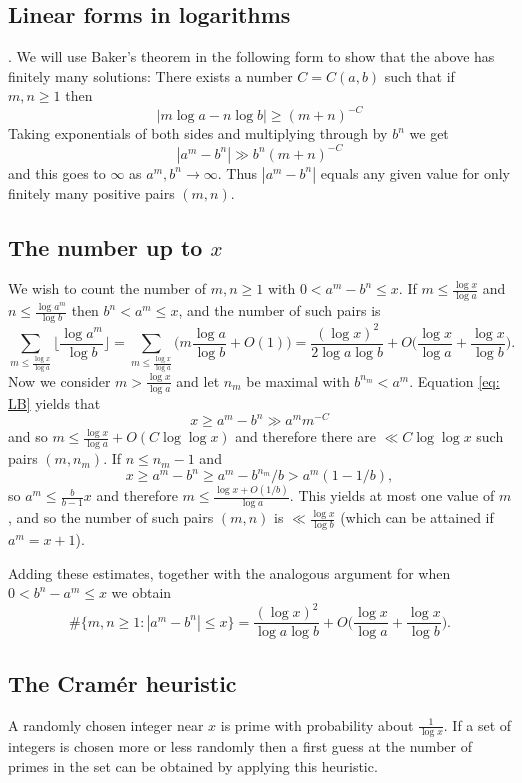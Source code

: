 \documentclass[12pt, a4paper,  reqno, english]{amsart}%
\numberwithin{equation}{section}
\theoremstyle{definition}
\renewcommand{\leq}{\leqslant}
\renewcommand{\geq}{\geqslant}
\begin{document}
\subsection{Linear forms in logarithms}
.  We will use Baker's theorem \cite{Bak} in the following form to show that the above has finitely many solutions: There exists a number $C=C(a,b)$ such that if $m,n\geq 1$ then
\[
|m\log a-n\log b|\geq (m+n)^{-C}
 \]
 Taking exponentials of both sides and multiplying through by $b^n$ we get
 \begin{equation} \label{eq: LB}
    |a^m-b^n| \gg b^n(m+n)^{-C}
 \end{equation}
 and this goes to $\infty$ as $a^m,b^n\to \infty$. 
 Thus  $|a^m - b^n |$ equals any given value for only finitely many positive pairs $(m,n)$.
 

\subsection{The number up to $x$}
We wish to count the number of $m,n\geq 1$ with $0<a^m-b^n\leq x$. 
If $m\leq \frac{\log x}{\log a}$  and $n\leq \frac{\log a^m}{\log b}$ then $b^n<a^m\leq x$, and the number of such pairs is
\[
\sum_{m\leq \frac{\log x}{\log a}} \bigg\lfloor \frac{\log a^m}{\log b} \bigg\rfloor = 
\sum_{m\leq \frac{\log x}{\log a}} \bigg( m \frac{\log a}{\log b}+O(1) \bigg) = \frac{(\log x)^2}{2\log a \log b} +O\bigg( \frac{\log x}{\log a}+\frac{\log x}{\log b} \bigg) .
\]
Now we consider $m> \frac{\log x}{\log a}$ and let $n_m$ be maximal with $b^{n_m}<a^m$.
  Equation \eqref{eq: LB} yields that 
  \[  x\geq a^m-b^n \gg a^mm^{-C} \]
  and so $m\leq \frac{\log x}{\log a}+O( C \log\log x)$ and therefore there are $\ll C \log\log x$ such pairs   
  $(m,n_m)$. If $n\leq n_m-1$ and 
\[
x\geq a^m-b^n\geq a^m-b^{n_m}/b>a^m(1-1/b),
\]
so $a^m\leq \frac b{b-1} x$ and therefore $m\leq \frac{\log x+O(1/b)}{\log a}$. This yields at most one   value of $m$, and so the number of such pairs $(m,n)$ is $\ll \frac{\log x}{\log b}$ (which can be attained if $a^m=x+1$).



Adding these estimates, together with the analogous argument for when $0<b^n-a^m\leq x$ we obtain
\[
\#\{ m,n\geq 1: |a^m-b^n|\leq x\} = \frac{(\log x)^2}{\log a \log b} +O\bigg( \frac{\log x}{\log a}+\frac{\log x}{\log b} \bigg) .
\]

\subsection{The Cram\'er heuristic} A randomly chosen integer near $x$ is prime with probability about $\frac 1{\log x}$. If a set of integers is chosen more or less randomly then a first guess at the number of primes in the set can be obtained by applying this heuristic.
\end{document}
